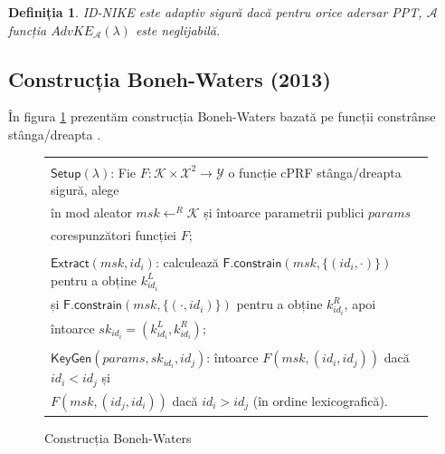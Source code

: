 \documentclass[oneside, 12pt]{book}
\newtheorem{definitie}{\textbf{Definiția}}[section]
\begin{document}
\begin{definitie}
	ID-NIKE este adaptiv sigură dacă pentru orice adersar PPT, $\mathcal{A}$ funcția $AdvKE_{\mathcal{A}}(\lambda)$ este neglijabilă.
\end{definitie}

\subsection{Construcția Boneh-Waters (2013)}
\label{subsec:boneh-waters}
În figura \ref{fig:bw-nike} prezentăm construcția Boneh-Waters bazată pe funcții constrânse stânga/dreapta \cite{boneh:2013constrained}.

\begin{figure}[h!]

\begin{tabular}{|p{\textwidth}|}
\hline

\\
\hspace{.1in}
$\mathsf{Setup}(\lambda)$: Fie $F : \mathcal{K} \times \mathcal{X}^2 \rightarrow \mathcal{Y}$ o funcție cPRF stânga/dreapta sigură, alege \\
	\hspace{.3in} în mod aleator $msk \leftarrow^R \mathcal{K}$ și întoarce parametrii publici $params$ \\ 
	\hspace{.3in} corespunzători funcției $F$; \\

\\
\hspace{.1in}
$\mathsf{Extract}(msk, id_i)$: calculează $\mathsf{F.constrain}(msk, \{(id_i, \cdot)\})$ pentru a obține $k^{L}_{id_i}$ \\
	\hspace{.3in} și $\mathsf{F.constrain}(msk, \{(\cdot, id_i)\})$ pentru a obține $k^{R}_{id_i}$, apoi \\ 
	\hspace{.3in} întoarce $sk_{id_i} = (k^{L}_{id_i},k^{R}_{id_i})$; \\

\\
\hspace{.1in}
$\mathsf{KeyGen}(params, sk_{id_i},id_j)$: întoarce $F(msk, (id_i, id_j))$ dacă $id_i < id_j$ și \\
	\hspace{.3in} $F(msk, (id_j, id_i))$ dacă $ id_i > id_j$ (în ordine lexicografică).

\\
\hline
\end{tabular}
\caption{Construcția Boneh-Waters \cite{boneh:2013constrained}}
\label{fig:bw-nike}
\end{figure}
\end{document}
